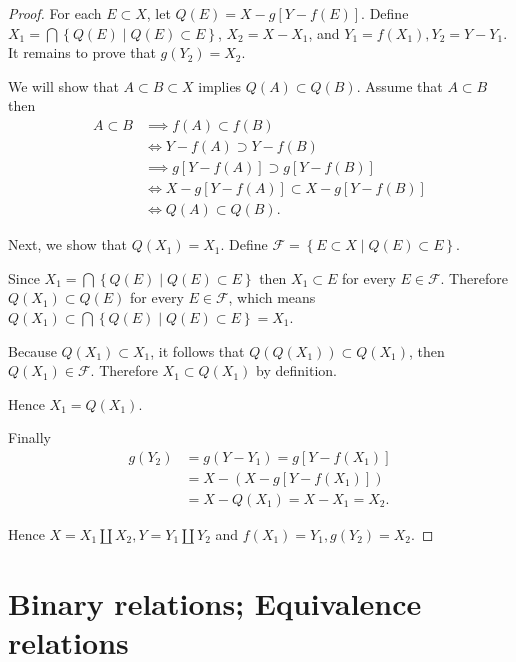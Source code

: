 \begin{proof}
	For each \( E \subset X \), let \( Q(E) = X - g[Y - f(E)] \). Define \( X_{1} = \bigcap \left\{ Q(E) \mid Q(E) \subset E \right\} \), \( X_{2} = X - X_{1} \), and \( Y_{1} = f(X_{1}), Y_{2} = Y - Y_{1} \). It remains to prove that \( g(Y_{2}) = X_{2} \).

	We will show that \( A \subset B \subset X \) implies \( Q(A) \subset Q(B) \). Assume that \( A \subset B \) then
	\begingroup
	\allowdisplaybreaks%
	\begin{align*}
		A \subset B & \implies f(A) \subset f(B)                   \\
		            & \iff Y - f(A) \supset Y - f(B)               \\
		            & \implies g[Y - f(A)] \supset g[Y - f(B)]     \\
		            & \iff X - g[Y - f(A)] \subset X - g[Y - f(B)] \\
		            & \iff Q(A) \subset Q(B).
	\end{align*}
	\endgroup

	Next, we show that \( Q(X_{1}) = X_{1} \). Define \( \mathcal{F} = \left\{ E \subset X \mid Q(E) \subset E \right\} \).

	Since \( X_{1} = \bigcap \left\{ Q(E) \mid Q(E) \subset E \right\} \) then \( X_{1} \subset E \) for every \( E \in \mathcal{F} \). Therefore \( Q(X_{1}) \subset Q(E) \) for every \( E \in \mathcal{F} \), which means \( Q(X_{1}) \subset \bigcap\left\{ Q(E) \mid Q(E) \subset E \right\} = X_{1} \).

	Because \( Q(X_{1}) \subset X_{1} \), it follows that \( Q(Q(X_{1})) \subset Q(X_{1}) \), then \( Q(X_{1}) \in \mathcal{F} \). Therefore \( X_{1} \subset Q(X_{1}) \) by definition.

	Hence \( X_{1} = Q(X_{1}) \).

	Finally
	\begingroup
	\allowdisplaybreaks%
	\begin{align*}
		g(Y_{2}) & = g(Y - Y_{1}) = g[Y - f(X_{1})]    \\
		         & = X - (X - g[Y - f(X_{1})])         \\
		         & = X - Q(X_{1}) = X - X_{1} = X_{2}.
	\end{align*}
	\endgroup

	Hence \( X = X_{1} \amalg X_{2}, Y = Y_{1} \amalg Y_{2} \) and \( f(X_{1}) = Y_{1}, g(Y_{2}) = X_{2} \).
\end{proof}

\section{Binary relations; Equivalence relations}


